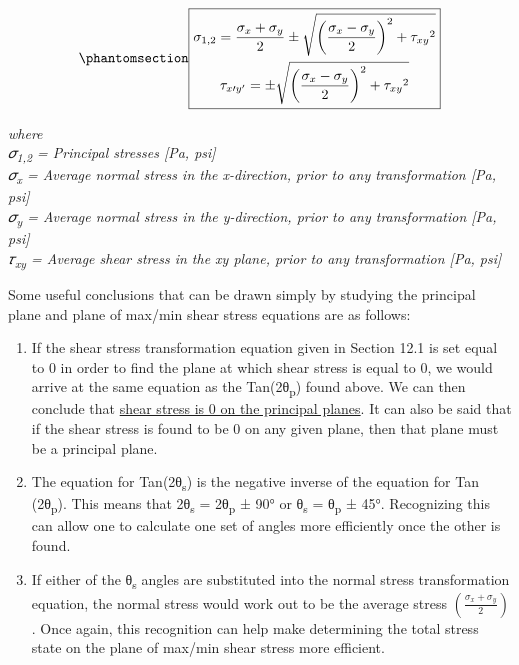 \documentclass[
  letterpaper,
  DIV=11,
  numbers=noendperiod]{scrreprt}
\theoremstyle{definition}
\theoremstyle{remark}
\begin{document}
\begin{equation}\phantomsection\label{eq-12.3}{
\boxed{\begin{gathered}
\sigma_{1,2}=\frac{\sigma_x+\sigma_y}{2} \pm \sqrt{\left(\frac{\sigma_x-\sigma_y}{2}\right)^2+\tau_{x y}{ }^2} \\
\tau_{x \prime y^{\prime}}= \pm \sqrt{\left(\frac{\sigma_x-\sigma_y}{2}\right)^2+\tau_{x y}{ }^2}
\end{gathered}}
}\end{equation}

\emph{where}\\
\emph{𝜎\textsubscript{1,2} = Principal stresses {[}Pa, psi{]}}\\
\emph{𝜎\textsubscript{x} = Average normal stress in the x-direction,
prior to any transformation {[}Pa, psi{]}}\\
\emph{𝜎\textsubscript{y} = Average normal stress in the y-direction,
prior to any transformation {[}Pa, psi{]}}\\
\emph{𝜏\textsubscript{xy} = Average shear stress in the xy plane, prior
to any transformation {[}Pa, psi{]}}

Some useful conclusions that can be drawn simply by studying the
principal plane and plane of max/min shear stress equations are as
follows:

\begin{enumerate}
\def\labelenumi{\arabic{enumi}.}
\item
  If the shear stress transformation equation given in Section 12.1 is
  set equal to 0 in order to find the plane at which shear stress is
  equal to 0, we would arrive at the same equation as the
  Tan(2θ\textsubscript{p}) found above. We can then conclude that
  \ul{shear stress is 0 on the principal planes}. It can also be said
  that if the shear stress is found to be 0 on any given plane, then
  that plane must be a principal plane.
\item
  The equation for Tan(2θ\textsubscript{s}) is the negative inverse of
  the equation for Tan (2θ\textsubscript{p}). This means that
  2θ\textsubscript{s} = 2θ\textsubscript{p} ± 90° or θ\textsubscript{s}
  = θ\textsubscript{p} ± 45°. Recognizing this can allow one to
  calculate one set of angles more efficiently once the other is found.
\item
  If either of the θ\textsubscript{s} angles are substituted into the
  normal stress transformation equation, the normal stress would work
  out to be the average stress
  \(\left(\frac{\sigma_x+\sigma_y}{2}\right)\). Once again, this
  recognition can help make determining the total stress state on the
  plane of max/min shear stress more efficient.
\end{enumerate}
\end{document}
